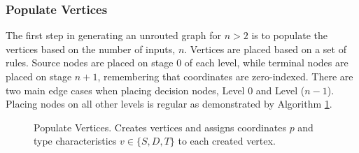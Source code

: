     \subsubsection{Populate Vertices}
    The first step in generating an unrouted graph for $n>2$ is to populate the vertices based on the number of inputs, $n$. Vertices are placed based on a set of rules. Source nodes are placed on stage 0 of each level, while terminal nodes are placed on stage $n+1$, remembering that coordinates are zero-indexed. There are two main edge cases when placing decision nodes, Level 0 and Level ($n-1$). Placing nodes on all other levels is regular as demonstrated by Algorithm \ref{alg:PopulateVertices}.

\begin{figure}
\begin{algorithm}[H]
\DontPrintSemicolon
{}
\caption{Populate Vertices. Creates vertices and assigns coordinates $p$ and type characteristics $v\in\{S,D,T\}$ to each created vertex.\label{alg:PopulateVertices}}
\end{algorithm}
\end{figure}

